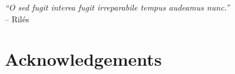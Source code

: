 \documentclass[a4paper,11pt,twoside,table]{style}
\begin{document}


\dominitoc


\cleardoublepage

 \begin{flushright}
\textit{``O sed fugit interea fugit irreparabile tempus audeamus nunc.''}\\
-- Ril\'es
\end{flushright}
\cleardoublepage


\cleardoublepage

\section*{Acknowledgements}

\begin{vcenterpage}
\end{vcenterpage}

\cleardoublepage
\end{document}
